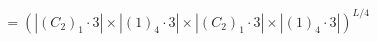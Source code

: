 \documentclass[preview]{standalone}
\begin{document}
\begin{align*}
\quad\\   &= \left(\left|(C_2)_1\cdot 3\right| \times \left|(1)_4\cdot 3\right|\times \left|(C_2)_1\cdot 3\right| \times \left|(1)_4\cdot 3\right|\right)^{L/4}
\end{align*}
\end{document}
